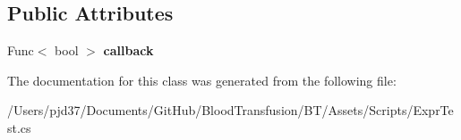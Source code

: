 \subsection*{Public Attributes}
\begin{DoxyCompactItemize}
\item 
Func$<$ bool $>$ {\bfseries callback}\hypertarget{class_b83_1_1_logic_expression_parser_1_1_delegate_bool_ab01aef9adb9394f583cb8347bd3d9b44}{}\label{class_b83_1_1_logic_expression_parser_1_1_delegate_bool_ab01aef9adb9394f583cb8347bd3d9b44}

\end{DoxyCompactItemize}


The documentation for this class was generated from the following file\+:\begin{DoxyCompactItemize}
\item 
/\+Users/pjd37/\+Documents/\+Git\+Hub/\+Blood\+Transfusion/\+B\+T/\+Assets/\+Scripts/Expr\+Test.\+cs\end{DoxyCompactItemize}
